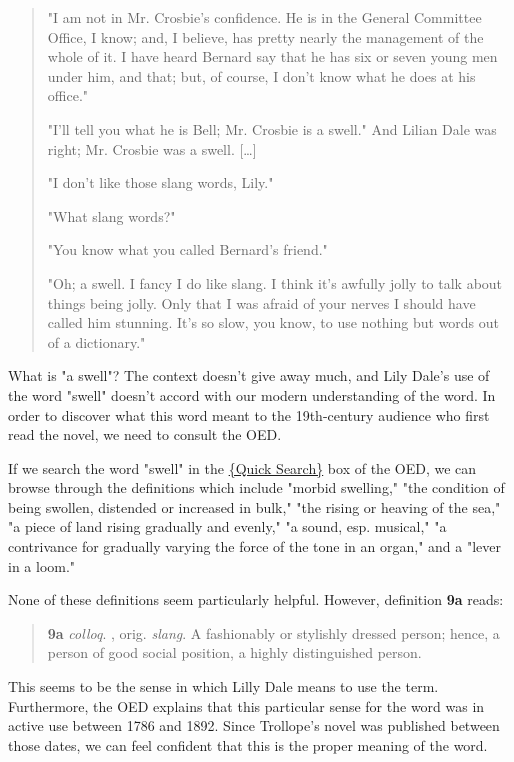 {\begin{quote} "I am not in Mr. Crosbie's confidence. He is in the General 
Committee Office, I know; and, I believe, has pretty nearly the management of 
the whole of it. I have heard Bernard say that he has six or seven young men 
under him, and that\textendash; but, of course, I don't know what he does at 
his office."

"I'll tell you what he is Bell; Mr. Crosbie is a swell." And Lilian Dale was 
right; Mr. Crosbie was a swell. [\dots]

 "I don't like those slang words, Lily."

"What slang words?"

"You know what you called Bernard's friend."

"Oh; a swell. I fancy I do like slang. I think it's awfully jolly to talk about 
things being jolly. Only that I was afraid of your nerves I should have called 
him stunning. It's so slow, you know, to use nothing but words out of a 
dictionary."
\end{quote}

What is "a swell"? The context doesn't give away much, and Lily Dale's use of 
the word "swell" doesn't accord with our modern understanding of the word. In 
order to discover what this word meant to the 19th-century audience who first 
read the novel, we need to consult the OED.

If we search the word "swell" in the 
\href{http://www.oed.com.ezproxy.bu.edu}{\{Quick Search\}} box of the OED, we 
can browse through the definitions which include "morbid swelling," "the 
condition of being swollen, distended or increased in bulk," "the rising or 
heaving of the sea," "a piece of land rising gradually and evenly," "a sound, 
esp. musical," "a contrivance for gradually varying the force of the tone in an 
organ," and a "lever in a loom."

None of these definitions seem particularly helpful. However, definition 
\textbf{9a} reads:

\begin{quote}\textbf{9a} \emph{colloq}. , orig. \emph{slang}. A fashionably or 
stylishly dressed person; hence, a person of good social position, a highly 
distinguished person. \end{quote}

This seems to be the sense in which Lilly Dale means to use the term. 
Furthermore, the OED explains that this particular sense for the word was in 
active use between 1786 and 1892. Since Trollope's novel was published between 
those dates, we can feel confident that this is the proper meaning of the word.

}

